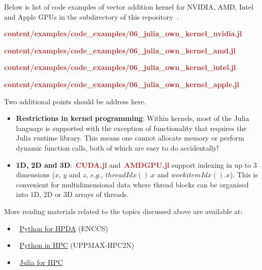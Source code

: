 \par
Below is list of code examples of vector addition kernel for NVIDIA, AMD, Intel and Apple GPUs in the subdirectory of this repository~\cite{gpu-programming-examples}.

\textbf{\textcolor{brown}{content/examples/code_examples/06_julia_own_kernel_nvidia.jl}}

\textbf{\textcolor{brown}{content/examples/code_examples/06_julia_own_kernel_amd.jl}}

\textbf{\textcolor{brown}{content/examples/code_examples/06_julia_own_kernel_intel.jl}}

\textbf{\textcolor{brown}{content/examples/code_examples/06_julia_own_kernel_apple.jl}}



\par
Two additional points should be address here.
\begin{itemize}
    \item \textbf{Restrictions in kernel programming}: Within kernels, most of the Julia language is supported with the exception of functionality that requires the Julia runtime library. This means one cannot allocate memory or perform dynamic function calls, both of which are easy to do accidentally!
    \item \textbf{1D, 2D and 3D}:~\textbf{\textcolor{brown}{CUDA.jl}} and~\textbf{\textcolor{brown}{AMDGPU.jl}} support indexing in up to 3 dimensions ($x$, $y$ and $z$, $e.g.$, $threadIdx().x$ and $workitemIdx().x$). This is convenient for multidimensional data where thread blocks can be organised into 1D, 2D or 3D arrays of threads.
\end{itemize}


\par
More reading materials related to the topics discussed above are available at:
\begin{itemize}
    \item~\href{https://enccs.github.io/hpda-python/parallel-computing/}{Python for HPDA} (ENCCS)
    \item~\href{https://uppmax.github.io/HPC-python/}{Python in HPC} (UPPMAX-HPC2N)
    \item~\href{https://enccs.github.io/julia-for-hpc/}{Julia for HPC}
\end{itemize}

